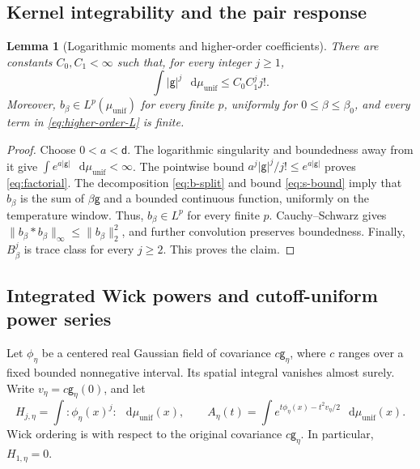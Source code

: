 \documentclass[11pt,reqno]{amsart}
\numberwithin{equation}{section}
\theoremstyle{plain}
\newtheorem{lemma}[lemma]{Lemma}
\theoremstyle{definition}
\renewcommand{\d}{\mathsf d}
\newcommand{\dd}{\mathop{}\!\mathrm d}
\newcommand{\be}{\beta}
\newcommand{\g}{\mathsf g}
\newcommand{\muunif}{\mu_{\mathrm{unif}}}
\begin{document}
\subsection{Kernel integrability and the pair response}

\begin{lemma}[Logarithmic moments and higher-order coefficients]\label{lem:kernel}
There are constants $C_0,C_1<\infty$ such that, for every integer $j\geq1$,
\begin{equation}\label{eq:factorial}
 \int |\g|^j\,\dd\muunif\leq C_0 C_1^j j!.
\end{equation}
Moreover, $b_\be\in L^p(\muunif)$ for every finite $p$, uniformly for $0\leq\be\leq\be_0$, and every term in \eqref{eq:higher-order-L} is finite.
\end{lemma}
\begin{proof}
Choose $0<a<\d$.  The logarithmic singularity and boundedness away from it give $\int e^{a|\g|}\,\dd\muunif<\infty$.  The pointwise bound $a^j|\g|^j/j!\leq e^{a|\g|}$ proves \eqref{eq:factorial}.  The decomposition \eqref{eq:b-split} and bound \eqref{eq:s-bound} imply that $b_\be$ is the sum of $\be\g$ and a bounded continuous function, uniformly on the temperature window.  Thus, $b_\be\in L^p$ for every finite $p$.  Cauchy--Schwarz gives $\|b_\be*b_\be\|_\infty\leq\|b_\be\|_2^2$, and further convolution preserves boundedness.  Finally, $B_\be^j$ is trace class for every $j\geq2$.  This proves the claim.
\end{proof}

\subsection{Integrated Wick powers and cutoff-uniform power series}

Let $\phi_\eta$ be a centered real Gaussian field of covariance $c \g_\eta$, where $c$ ranges over a fixed bounded nonnegative interval. Its spatial integral vanishes almost surely. Write $v_\eta=c\g_\eta(0)$, and let
\begin{equation}\label{eq:Wick}
 H_{j,\eta}=\int :\!\phi_\eta(x)^j\!:\,\dd \muunif(x),\qquad
 A_\eta(t)=\int e^{t\phi_\eta(x)-t^2v_\eta/2}\,\dd \muunif(x).
\end{equation}
Wick ordering is with respect to the original covariance $c\g_\eta$. In particular, $H_{1,\eta}=0$.
\end{document}

